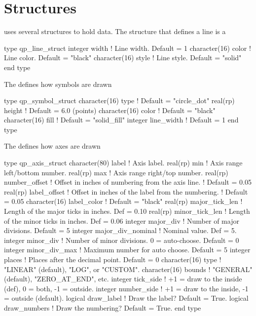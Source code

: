 \section{Structures}
\label{s:qp.structs}

\quickplot uses several structures to hold data. The structure that
defines a line is a 
\begin{example}
  type qp_line_struct
    integer width         ! Line width. Default = 1
    character(16) color   ! Line color. Default = "black"
    character(16) style   ! Line style. Default = "solid"
  end type
\end{example}

The  defines how symbols are drawn 
\begin{example}
  type qp_symbol_struct
    character(16)  type        ! Default = "circle_dot"
    real(rp) height            ! Default = 6.0 (points)
    character(16)  color       ! Default = "black"
    character(16)  fill        ! Default = "solid_fill"
    integer  line_width        ! Default = 1
  end type
\end{example}

The  defines how axes are drawn 
\begin{example}
  type qp_axis_struct
    character(80) label       ! Axis label.
    real(rp) min              ! Axis range left/bottom number.
    real(rp) max              ! Axis range right/top number.
    real(rp) number_offset    ! Offset in inches of numbering from the axis line. 
                              !  Default = 0.05
    real(rp) label_offset     ! Offset in inches of the label from the numbering.
                              !  Default = 0.05
    character(16) label_color ! Default = "black"
    real(rp) major_tick_len   ! Length of the major ticks in inches. Def = 0.10
    real(rp) minor_tick_len   ! Length of the minor ticks in inches. Def = 0.06
    integer major_div         ! Number of major divisions. Default = 5
    integer major_div_nominal ! Nominal value. Def = 5.
    integer minor_div         ! Number of minor divisions. 0 = auto-choose. Default = 0
    integer minor_div_max     ! Maximum number for auto choose. Default = 5
    integer places            ! Places after the decimal point. Default = 0
    character(16) type        ! "LINEAR" (default), "LOG", or "CUSTOM".
    character(16) bounds      ! "GENERAL" (default), "ZERO_AT_END", etc.
    integer tick_side         ! +1 = draw to the inside (def), 0 = both, -1 = outside.
    integer number_side       ! +1 = draw to the inside, -1 = outside (default).
    logical draw_label        ! Draw the label? Default = True.
    logical draw_numbers      ! Draw the numbering? Default = True.
  end type
\end{example}

